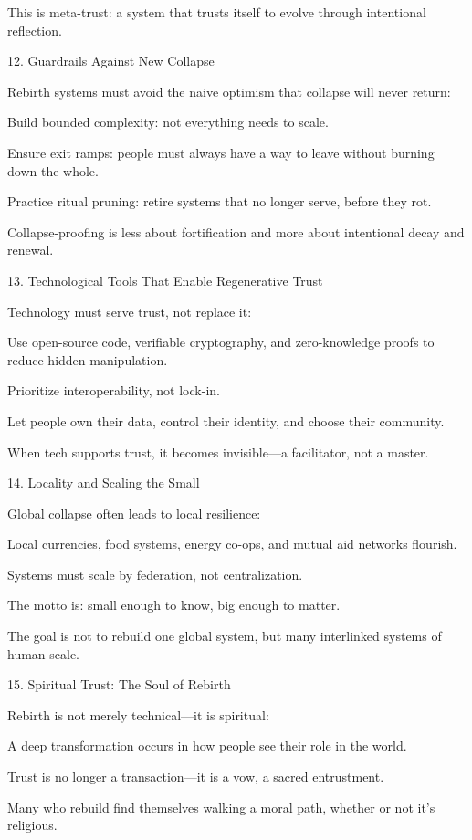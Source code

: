 \documentclass[11pt,oneside]{book}
\begin{document}
This is meta-trust: a system that trusts itself to evolve through intentional reflection.

12. Guardrails Against New Collapse


Rebirth systems must avoid the naive optimism that collapse will never return:

    Build bounded complexity: not everything needs to scale.

    Ensure exit ramps: people must always have a way to leave without burning down the whole.

    Practice ritual pruning: retire systems that no longer serve, before they rot.

Collapse-proofing is less about fortification and more about intentional decay and renewal.

13. Technological Tools That Enable Regenerative Trust


Technology must serve trust, not replace it:

    Use open-source code, verifiable cryptography, and zero-knowledge proofs to reduce hidden manipulation.

    Prioritize interoperability, not lock-in.

    Let people own their data, control their identity, and choose their community.

When tech supports trust, it becomes invisible—a facilitator, not a master.

14. Locality and Scaling the Small


Global collapse often leads to local resilience:

    Local currencies, food systems, energy co-ops, and mutual aid networks flourish.

    Systems must scale by federation, not centralization.

    The motto is: small enough to know, big enough to matter.

The goal is not to rebuild one global system, but many interlinked systems of human scale.

15. Spiritual Trust: The Soul of Rebirth


Rebirth is not merely technical—it is spiritual:

    A deep transformation occurs in how people see their role in the world.

    Trust is no longer a transaction—it is a vow, a sacred entrustment.

    Many who rebuild find themselves walking a moral path, whether or not it’s religious.
\end{document}
